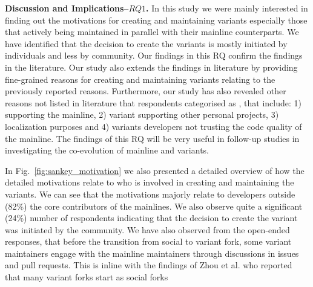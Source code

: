 \nd \textbf{Discussion and Implications--$RQ1$.}
In this study we were mainly interested in finding out the motivations for creating and maintaining variants especially those that actively being maintained in parallel with their mainline counterparts.
We have identified that the decision to create the variants is mostly initiated by individuals and less by community.
Our findings in this RQ confirm the findings in the literature.
Our study also extends the findings in literature by providing fine-grained reasons for creating and maintaining variants relating to the previously reported reasons.
Furthermore, our study has also revealed other reasons not listed in literature that respondents categorised as , that include: 1) supporting the mainline, 2) variant supporting other personal projects, 3) localization purposes and 4) variants developers not trusting the code quality of the mainline.
The findings of this RQ will be very useful in follow-up studies in investigating the co-evolution of mainline and variants.

In Fig.~\ref{fig:sankey_motivation} we also presented a detailed overview of how the detailed motivations relate to who is involved in creating and maintaining the variants. We can see that the motivations majorly relate to developers outside (82\%) the core contributors of the mainlines. We also observe quite a significant (24\%) number of respondents indicating that the decision to create the variant was initiated by the community. We have also observed from the open-ended responses, that before the transition from social to variant fork, some variant maintainers engage with the mainline maintainers through discussions in issues and pull requests. This is inline with the findings of Zhou et al. who reported that many variant forks start as social forks~\cite{Zhou:2020}

